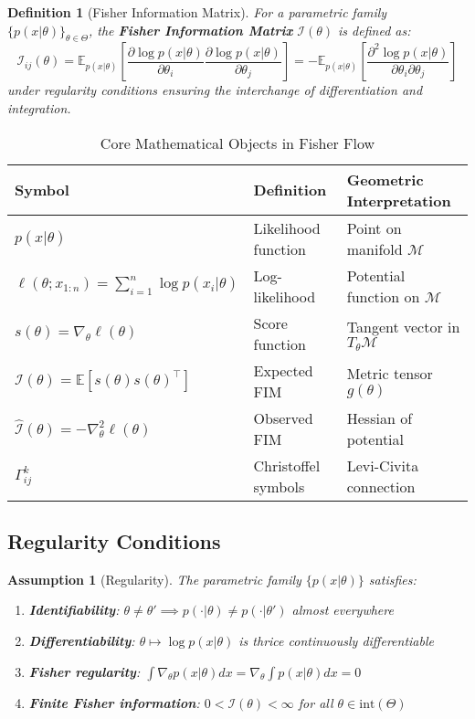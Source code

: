 \documentclass[11pt]{article}
\newtheorem{definition}[theorem]{Definition}
\newtheorem{assumption}[theorem]{Assumption}
\begin{document}
\begin{definition}[Fisher Information Matrix]
For a parametric family $\{p(x|\theta)\}_{\theta \in \Theta}$, the \textbf{Fisher Information Matrix} $\mathcal{I}(\theta)$ is defined as:
\begin{equation}
\mathcal{I}_{ij}(\theta) = \mathbb{E}_{p(x|\theta)}\left[\frac{\partial \log p(x|\theta)}{\partial \theta_i} \frac{\partial \log p(x|\theta)}{\partial \theta_j}\right] = -\mathbb{E}_{p(x|\theta)}\left[\frac{\partial^2 \log p(x|\theta)}{\partial \theta_i \partial \theta_j}\right]
\end{equation}
under regularity conditions ensuring the interchange of differentiation and integration.
\end{definition}

\begin{table}[h!]
\centering
\caption{Core Mathematical Objects in Fisher Flow}
\begin{tabular}{lll}
\toprule
Symbol & Definition & Geometric Interpretation \\
\midrule
$p(x|\theta)$ & Likelihood function & Point on manifold $\mathcal{M}$ \\
$\ell(\theta; x_{1:n}) = \sum_{i=1}^n \log p(x_i|\theta)$ & Log-likelihood & Potential function on $\mathcal{M}$ \\
$s(\theta) = \nabla_\theta \ell(\theta)$ & Score function & Tangent vector in $T_\theta\mathcal{M}$ \\
$\mathcal{I}(\theta) = \mathbb{E}[s(\theta)s(\theta)^\top]$ & Expected FIM & Metric tensor $g(\theta)$ \\
$\hat{\mathcal{I}}(\theta) = -\nabla^2_\theta \ell(\theta)$ & Observed FIM & Hessian of potential \\
$\Gamma^k_{ij}$ & Christoffel symbols & Levi-Civita connection \\
\bottomrule
\end{tabular}
\end{table}

\subsection{Regularity Conditions}

\begin{assumption}[Regularity]
\label{ass:regularity}
The parametric family $\{p(x|\theta)\}$ satisfies:
\begin{enumerate}
\item \textbf{Identifiability}: $\theta \neq \theta' \implies p(\cdot|\theta) \neq p(\cdot|\theta')$ almost everywhere
\item \textbf{Differentiability}: $\theta \mapsto \log p(x|\theta)$ is thrice continuously differentiable
\item \textbf{Fisher regularity}: $\int \nabla_\theta p(x|\theta) dx = \nabla_\theta \int p(x|\theta) dx = 0$
\item \textbf{Finite Fisher information}: $0 < \mathcal{I}(\theta) < \infty$ for all $\theta \in \text{int}(\Theta)$
\end{enumerate}
\end{assumption}
\end{document}
